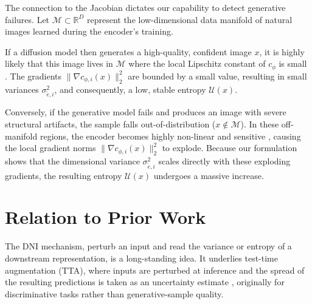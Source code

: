 The connection to the Jacobian dictates our capability to detect generative failures. Let $\mathcal{M} \subset \mathbb{R}^D$ represent the low-dimensional data manifold of natural images learned during the encoder's training.

If a diffusion model then generates a high-quality, confident image $x$, it is highly likely that this image lives in $\mathcal{M}$ where the local Lipschitz constant of $c_\phi$ is small \parencite{novak_sensitivity_2018}. The gradients $\|\nabla c_{\phi, i}(x)\|_2^2$ are bounded by a small value, resulting in small variances $\sigma_{\tilde{e},i}^2$, and consequently, a low, stable entropy $\mathcal{U}(x)$.

Conversely, if the generative model fails and produces an image with severe structural artifacts, the sample falls out-of-distribution ($x \notin \mathcal{M}$). In these off-manifold regions, the encoder becomes highly non-linear and sensitive \parencite{novak_sensitivity_2018}, causing the local gradient norms $\|\nabla c_{\phi, i}(x)\|_2^2$ to explode. Because our formulation shows that the dimensional variance $\sigma_{\tilde{e},i}^2$ scales directly with these exploding gradients, the resulting entropy $\mathcal{U}(x)$ undergoes a massive increase.



\section{Relation to Prior Work}

The \acs{DNI} mechanism, perturb an input and read the variance or entropy of a downstream representation, is a long-standing idea. It underlies test-time augmentation (\acs{TTA}), where inputs are perturbed at inference and the spread of the resulting predictions is taken as an uncertainty estimate \parencite{wang_aleatoric_2019}, originally for discriminative tasks rather than generative-sample quality. 

